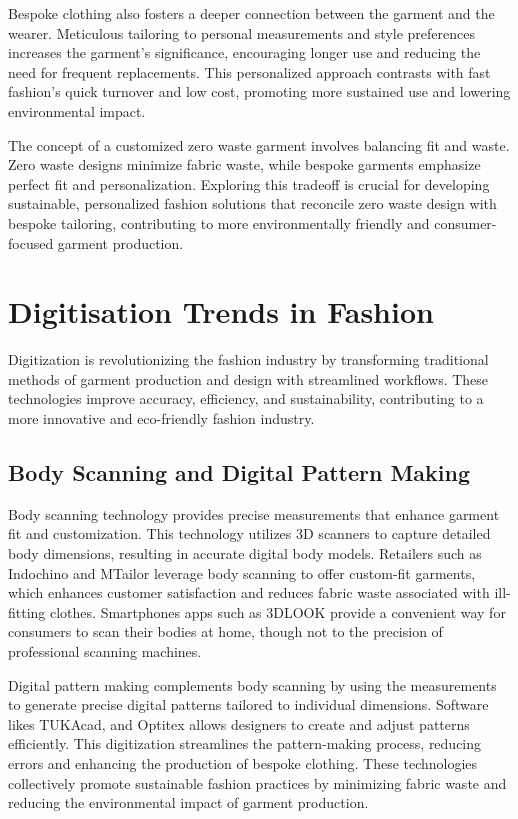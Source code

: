 Bespoke clothing also fosters a deeper connection between the garment and the wearer. Meticulous tailoring to personal measurements and style preferences increases the garment's significance, encouraging longer use and reducing the need for frequent replacements. This personalized approach contrasts with fast fashion's quick turnover and low cost, promoting more sustained use and lowering environmental impact.

The concept of a customized zero waste garment involves balancing fit and waste. Zero waste designs minimize fabric waste, while bespoke garments emphasize perfect fit and personalization. Exploring this tradeoff is crucial for developing sustainable, personalized fashion solutions that reconcile zero waste design with bespoke tailoring, contributing to more environmentally friendly and consumer-focused garment production.

\section{Digitisation Trends in Fashion}
Digitization is revolutionizing the fashion industry by transforming traditional methods of garment production and design with streamlined workflows. These technologies improve accuracy, efficiency, and sustainability, contributing to a more innovative and eco-friendly fashion industry.

\subsection{Body Scanning and Digital Pattern Making}
Body scanning technology provides precise measurements that enhance garment fit and customization. This technology utilizes 3D scanners to capture detailed body dimensions, resulting in accurate digital body models. Retailers such as Indochino and MTailor leverage body scanning to offer custom-fit garments, which enhances customer satisfaction and reduces fabric waste associated with ill-fitting clothes. Smartphones apps such as 3DLOOK provide a convenient way for consumers to scan their bodies at home, though not to the precision of professional scanning machines.

Digital pattern making complements body scanning by using the measurements to generate precise digital patterns tailored to individual dimensions. Software likes TUKAcad, and Optitex allows designers to create and adjust patterns efficiently. This digitization streamlines the pattern-making process, reducing errors and enhancing the production of bespoke clothing. These technologies collectively promote sustainable fashion practices by minimizing fabric waste and reducing the environmental impact of garment production.

